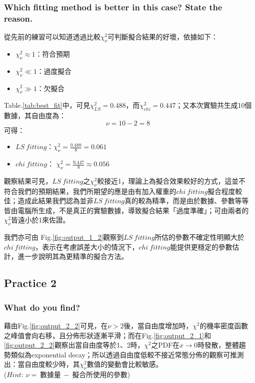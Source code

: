 \documentclass[12pt,a4paper]{article}
\begin{document}
\begin{CJK}{UTF8}{bkai}
\subsubsection{Which fitting method is better in this case? State the reason.}
\hfill

從先前的練習可以知道透過比較$\chi^2_\nu$可判斷擬合結果的好壞，依據如下：
\begin{itemize}
    \item $\chi^2_\nu\approx1$：符合預期
    \item $\chi^2_\nu\ll1$：過度擬合
    \item $\chi^2_\nu \gg1$：欠擬合
\end{itemize}
Table.\ref{tab:best_fit}中，可見$\chi^2_{LS}=0.488$，而$\chi^2_{chi}=0.447$；又本次實驗共生成10個數據，其自由度為：
\begin{equation}
    \nu = 10-2=8
    \nonumber
\end{equation}
可得：
\begin{itemize}
    \item $LS\ fitting$：$\chi^2_\nu=\frac{0.488}{8}=0.061$
    \item $chi\ fitting$：
    $\chi^2_\nu=\frac{0.447}{8}\approx0.056$
\end{itemize}

觀察結果可見，$LS \ fitting$之$\chi^2_\nu$較接近1，理論上為擬合效果較好的方式，這並不符合我們的預期結果，我們所期望的應是由有加入權重的$chi\ fitting$擬合程度較佳；造成此結果我們認為並非$LS\ fitting$真的較為精準，而是由於數據、參數等等皆由電腦所生成，不是真正的實驗數據，導致擬合結果「過度準確」；可由兩者的$\chi^2_\nu$皆遠小於1來佐證。

我們亦可由 Fig.\ref{fig:output_1_2}觀察到$LS\ fitting$所估的參數不確定性明顯大於$chi\ fitting$，表示在考慮誤差大小的情況下，$chi\ fitting$能提供更穩定的參數估計，進一步說明其為更精準的擬合方法。

\subsection{Practice 2}

\subsubsection{What do you find?}
\hfill

藉由Fig.\ref{fig:output_2_2}可見，在$\nu>2$後，當自由度增加時，$\chi^2$的機率密度函數之峰值會向右移，且分佈形狀逐漸平滑；而在Fig.\ref{fig:output_2_1}和\ref{fig:output_2_2}觀察出當自由度等於1、2時，$\chi^2$之PDF在$x \to 0$時發散，整體趨勢類似為exponential decay；所以透過自由度低較不接近常態分佈的觀察可推測出：當自由度較少時，其$\chi^2_\nu$數值的變動會比較敏感。\\($Hint:\ $$\nu=\ $數據量$\ -\ $擬合所使用的參數)


\end{CJK}
\end{document}

